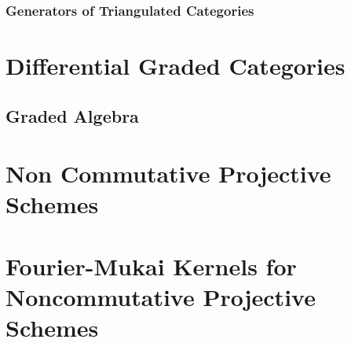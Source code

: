 \subsection{Generators of Triangulated Categories}

\chapter{Differential Graded Categories}

\section{Graded Algebra}

\chapter{Non Commutative Projective Schemes}

\chapter{Fourier-Mukai Kernels for Noncommutative Projective Schemes}






